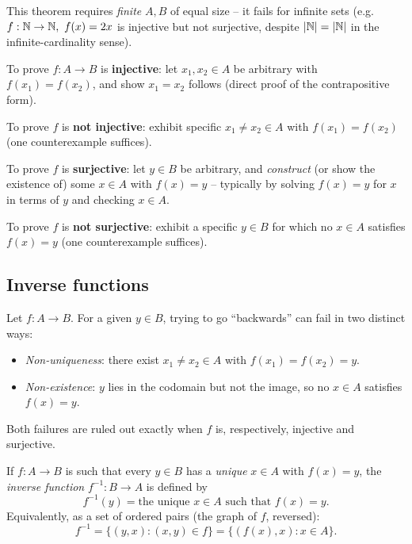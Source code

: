 \documentclass[11pt]{article}
\begin{document}
\begin{note}
This theorem requires \emph{finite} $A, B$ of equal size -- it fails for infinite sets (e.g.\ $f:\mathbb{N}\to\mathbb{N},\ f(x)=2x$ is injective but not surjective, despite $|\mathbb{N}|=|\mathbb{N}|$ in the infinite-cardinality sense).
\end{note}

\begin{note}
To prove $f: A \to B$ is \textbf{injective}: let $x_1, x_2 \in A$ be arbitrary with $f(x_1) = f(x_2)$, and show $x_1 = x_2$ follows (direct proof of the contrapositive form).

To prove $f$ is \textbf{not injective}: exhibit specific $x_1 \neq x_2 \in A$ with $f(x_1) = f(x_2)$ (one counterexample suffices).

To prove $f$ is \textbf{surjective}: let $y \in B$ be arbitrary, and \emph{construct} (or show the existence of) some $x \in A$ with $f(x) = y$ -- typically by solving $f(x) = y$ for $x$ in terms of $y$ and checking $x \in A$.

To prove $f$ is \textbf{not surjective}: exhibit a specific $y \in B$ for which no $x \in A$ satisfies $f(x) = y$ (one counterexample suffices).
\end{note}

\subsection{Inverse functions}
\label{sec:2-8}

\begin{note}
Let $f: A \to B$. For a given $y \in B$, trying to go ``backwards'' can fail in two distinct ways:
\begin{itemize}
    \item \emph{Non-uniqueness}: there exist $x_1 \neq x_2 \in A$ with $f(x_1) = f(x_2) = y$.
    \item \emph{Non-existence}: $y$ lies in the codomain but not the image, so no $x \in A$ satisfies $f(x)=y$.
\end{itemize}
Both failures are ruled out exactly when $f$ is, respectively, injective and surjective.
\end{note}

\begin{definition}
If $f: A \to B$ is such that every $y \in B$ has a \emph{unique} $x \in A$ with $f(x) = y$, the \emph{inverse function} $f^{-1} : B \to A$ is defined by
\[
f^{-1}(y) = \text{the unique } x \in A \text{ such that } f(x) = y.
\]
Equivalently, as a set of ordered pairs (the graph of $f$, reversed):
\[
f^{-1} = \{(y,x) : (x,y) \in f\} = \{(f(x),x) : x \in A\}.
\]
\end{definition}
\end{document}
